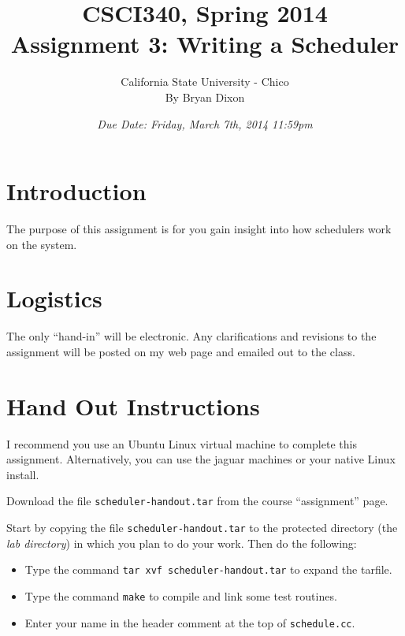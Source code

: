 \documentclass[11pt]{article}
\begin{document}
\title{CSCI340, Spring 2014\\
Assignment 3: Writing a Scheduler
}

\author{California State University - Chico\\
  By Bryan Dixon\\
}
\date{\emph{Due Date: Friday, March 7th, 2014 11:59pm}}


\maketitle

\section*{Introduction}
The purpose of this assignment is for you gain insight into how schedulers work on the system. 

\section*{Logistics}

The only ``hand-in'' will be
electronic.  Any clarifications and revisions to the assignment will
be posted on my web page and emailed out to the class.

\section*{Hand Out Instructions}

I recommend you use an Ubuntu Linux virtual machine to complete this
assignment.  Alternatively, you can use the jaguar machines or your native Linux install. 

Download the file \texttt{scheduler-handout.tar} from the course
``assignment'' page.

Start by copying the file {\tt scheduler-handout.tar}
to the protected directory (the {\em lab directory}) in which you plan
to do your work.  Then do the following:

\begin{itemize}
\item Type the command {\tt tar xvf scheduler-handout.tar} 
to expand the tarfile.

\item Type the command {\tt make} to compile and link some
test routines.

\item Enter your name in the header
comment at the top of {\tt schedule.cc}.

\end{itemize}
\end{document}
